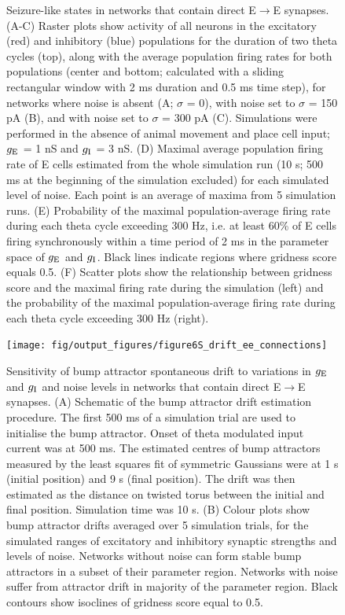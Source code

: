 \documentclass[a4paper,12pt]{article}
\newcommand{\ssc}[3]{\ensuremath{#1_{\text{#2}_{\text{#3}}}}}
\newcommand{\gE      }{\ssc{g}      {\scriptsize{E}}{}}
\newcommand{\gI      }{\ssc{g}      {\scriptsize{I}}{}}
\begin{document}
\begin{figure}[H]
    \internallinenumbers
    \caption{Seizure-like states in networks that contain direct
    E$\rightarrow$E synapses. (A-C) Raster plots show activity of all neurons
    in the excitatory (red) and inhibitory (blue) populations for the duration
    of two theta cycles (top), along with the average population firing rates
    for both populations (center and bottom; calculated with a sliding
    rectangular window with 2 ms duration and 0.5 ms time step), for networks
    where noise is absent (A; $\sigma$ = 0), with noise set to $\sigma$ = 150
    pA (B), and with noise set to $\sigma$ = 300 pA (C). Simulations were
    performed in the absence of animal movement and place cell input; $\gE$ = 1 nS
    and $\gI$ = 3 nS.  (D) Maximal average population firing rate of E cells
    estimated from the whole simulation run (10 s; 500 ms at the beginning of
    the simulation excluded) for each simulated level of noise. Each point is
    an average of maxima from 5 simulation runs.  (E) Probability of the
    maximal population-average firing rate during each theta cycle exceeding
    300 Hz, i.e. at least 60\% of E cells firing synchronously within a time
    period of 2 ms in the parameter space of $\gE$ and $\gI$. Black lines indicate
    regions where gridness score equals 0.5. (F) Scatter plots show the
    relationship between gridness score and the maximal firing rate during the
    simulation (left) and the probability of the maximal population-average
    firing rate during each theta cycle exceeding 300 Hz (right).}
\end{figure}

\clearpage

\begin{figure}[ht!]
    \internallinenumbers
    \centering
        \texttt{[image: fig/output\_figures/figure6S\_drift\_ee\_connections]}
    \caption{Sensitivity of bump attractor spontaneous drift to variations in
    $\gE$ and $\gI$ and noise levels in networks that contain direct
    E$\rightarrow$E synapses. (A) Schematic of the bump attractor drift
    estimation procedure. The first 500 ms of a simulation trial are used to
    initialise the bump attractor. Onset of theta modulated input current was
    at 500 ms.  The estimated centres of bump attractors measured by the least
    squares fit of symmetric Gaussians were at 1 s (initial position) and 9 s
    (final position). The drift was then estimated as the distance on twisted
    torus between the initial and final position. Simulation time was 10 s. (B)
    Colour plots show bump attractor drifts averaged over 5 simulation trials,
    for the simulated ranges of excitatory and inhibitory synaptic strengths
    and levels of noise.  Networks without noise can form stable bump
    attractors in a subset of their parameter region. Networks with noise
    suffer from attractor drift in majority of the parameter region. Black
    contours show isoclines of gridness score equal to 0.5.}
\end{figure}
\end{document}
